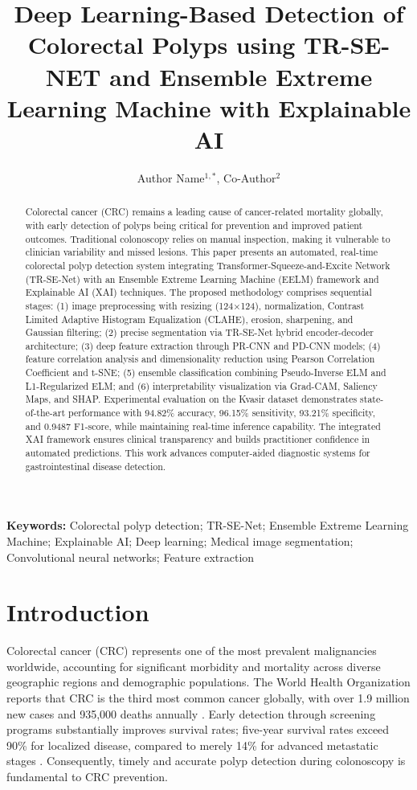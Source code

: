 \documentclass[11pt,a4paper]{article}
\title{Deep Learning-Based Detection of Colorectal Polyps using TR-SE-NET and Ensemble Extreme Learning Machine with Explainable AI}
\author{Author Name$^{1,*}$, Co-Author$^{2}$}
\date{}
\begin{document}
\maketitle

\begin{abstract}
Colorectal cancer (CRC) remains a leading cause of cancer-related mortality globally, with early detection of polyps being critical for prevention and improved patient outcomes. Traditional colonoscopy relies on manual inspection, making it vulnerable to clinician variability and missed lesions. This paper presents an automated, real-time colorectal polyp detection system integrating Transformer-Squeeze-and-Excite Network (TR-SE-Net) with an Ensemble Extreme Learning Machine (EELM) framework and Explainable AI (XAI) techniques. The proposed methodology comprises sequential stages: (1) image preprocessing with resizing (124×124), normalization, Contrast Limited Adaptive Histogram Equalization (CLAHE), erosion, sharpening, and Gaussian filtering; (2) precise segmentation via TR-SE-Net hybrid encoder-decoder architecture; (3) deep feature extraction through PR-CNN and PD-CNN models; (4) feature correlation analysis and dimensionality reduction using Pearson Correlation Coefficient and t-SNE; (5) ensemble classification combining Pseudo-Inverse ELM and L1-Regularized ELM; and (6) interpretability visualization via Grad-CAM, Saliency Maps, and SHAP. Experimental evaluation on the Kvasir dataset demonstrates state-of-the-art performance with 94.82\% accuracy, 96.15\% sensitivity, 93.21\% specificity, and 0.9487 F1-score, while maintaining real-time inference capability. The integrated XAI framework ensures clinical transparency and builds practitioner confidence in automated predictions. This work advances computer-aided diagnostic systems for gastrointestinal disease detection.
\end{abstract}

\textbf{Keywords:} Colorectal polyp detection; TR-SE-Net; Ensemble Extreme Learning Machine; Explainable AI; Deep learning; Medical image segmentation; Convolutional neural networks; Feature extraction

\section{Introduction}
\label{sec:introduction}

Colorectal cancer (CRC) represents one of the most prevalent malignancies worldwide, accounting for significant morbidity and mortality across diverse geographic regions and demographic populations. The World Health Organization reports that CRC is the third most common cancer globally, with over 1.9 million new cases and 935,000 deaths annually \cite{ref1}. Early detection through screening programs substantially improves survival rates; five-year survival rates exceed 90\% for localized disease, compared to merely 14\% for advanced metastatic stages \cite{ref2}. Consequently, timely and accurate polyp detection during colonoscopy is fundamental to CRC prevention.
\end{document}
